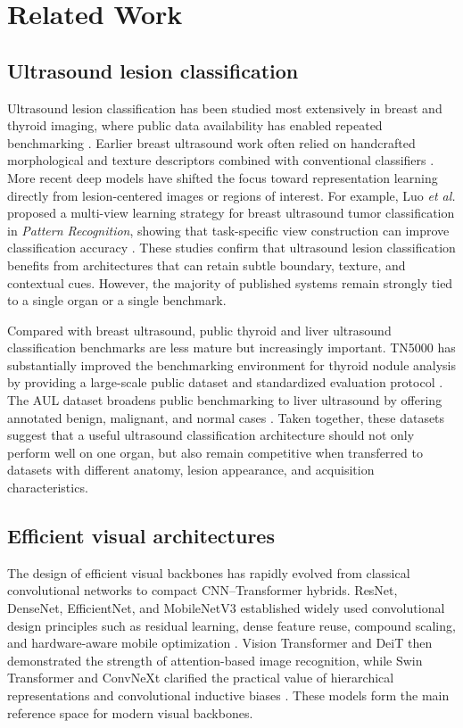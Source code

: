\section{Related Work}
\label{sec:related_work}

\subsection{Ultrasound lesion classification}
Ultrasound lesion classification has been studied most extensively in breast and thyroid imaging, where public data availability has enabled repeated benchmarking \cite{Al_Dhabyani_2020,Zhang_2025}. Earlier breast ultrasound work often relied on handcrafted morphological and texture descriptors combined with conventional classifiers \cite{G_mez_Flores_2015}. More recent deep models have shifted the focus toward representation learning directly from lesion-centered images or regions of interest. For example, Luo \textit{et al.} proposed a multi-view learning strategy for breast ultrasound tumor classification in \textit{Pattern Recognition}, showing that task-specific view construction can improve classification accuracy \cite{Luo_2023}. These studies confirm that ultrasound lesion classification benefits from architectures that can retain subtle boundary, texture, and contextual cues. However, the majority of published systems remain strongly tied to a single organ or a single benchmark.

Compared with breast ultrasound, public thyroid and liver ultrasound classification benchmarks are less mature but increasingly important. TN5000 has substantially improved the benchmarking environment for thyroid nodule analysis by providing a large-scale public dataset and standardized evaluation protocol \cite{Zhang_2025}. The AUL dataset broadens public benchmarking to liver ultrasound by offering annotated benign, malignant, and normal cases \cite{aul_dataset}. Taken together, these datasets suggest that a useful ultrasound classification architecture should not only perform well on one organ, but also remain competitive when transferred to datasets with different anatomy, lesion appearance, and acquisition characteristics.

\subsection{Efficient visual architectures}
The design of efficient visual backbones has rapidly evolved from classical convolutional networks to compact CNN--Transformer hybrids. ResNet, DenseNet, EfficientNet, and MobileNetV3 established widely used convolutional design principles such as residual learning, dense feature reuse, compound scaling, and hardware-aware mobile optimization \cite{he2016resnet,huang2017densenet,tan2019efficientnet,howard2019mobilenetv3}. Vision Transformer and DeiT then demonstrated the strength of attention-based image recognition, while Swin Transformer and ConvNeXt clarified the practical value of hierarchical representations and convolutional inductive biases \cite{dosovitskiy2021vit,touvron2021deit,liu2021swin,liu2022convnext}. These models form the main reference space for modern visual backbones.

